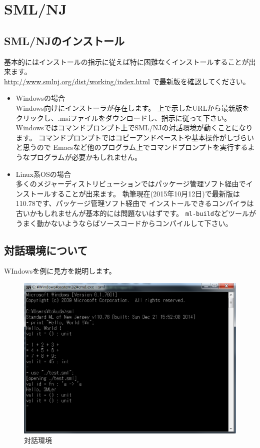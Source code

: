\documentclass[11pt,a4paper]{article}
\begin{document}
\section{SML/NJ}
\subsection{SML/NJのインストール}
基本的にはインストールの指示に従えば特に困難なくインストールすることが出来ます。\\
\url{http://www.smlnj.org/dist/working/index.html} で最新版を確認してください。
\begin{itemize}
\item Windowsの場合\\
  Windows向けにインストーラが存在します。
  上で示したURLから最新版をクリックし、.msiファイルをダウンロードし、指示に従って下さい。\\
  Windowsではコマンドプロンプト上でSML/NJの対話環境が動くことになります。
  コマンドプロンプトではコピーアンドペーストや基本操作がしづらいと思うので
  Emacsなど他のプログラム上でコマンドプロンプトを実行するようなプログラムが必要かもしれません。
\item Linux系OSの場合\\
  多くのメジャーディストリビューションではパッケージ管理ソフト経由でインストールすることが出来ます。
  執筆現在(2015年10月12日)で最新版は110.78です、パッケージ管理ソフト経由で
  インストールできるコンパイラは古いかもしれませんが基本的には問題ないはずです。
  \lstinline{ml-build}などツールがうまく動かないようならばソースコードからコンパイルして下さい。
\end{itemize}
\subsection{対話環境について}
WIndowsを例に見方を説明します。

\begin{figure}[htbp]
  \centering
  \includegraphics[scale=0.8]{./interactive.eps}
  \caption{対話環境}
  \label{fig:hello}
\end{figure}
\end{document}
